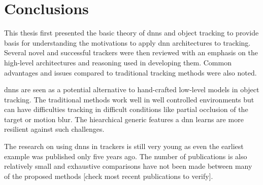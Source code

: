 \section{Conclusions}

This thesis first presented the basic theory of \ac{dnn}s and object tracking to
provide basis for understanding the motivations to apply \ac{dnn} architectures
to tracking. Several novel and successful trackers were then reviewed with an emphasis
on the high-level architectures and reasoning used in developing them. Common advantages
and issues compared to traditional tracking methods were also noted.

\ac{dnn}s are seen as a potential alternative to hand-crafted low-level models in
object tracking. The traditional methods work well in well controlled environments
but can have difficulties tracking in difficult conditions like partial occlusion
of the target or motion blur. The hiearchical generic features a \ac{dnn} learns
are more resilient against such challenges.

The research on using \ac{dnn}s in trackers is still very young as even the earliest
example was published only five years ago. The number of publications is also relatively
small and exhaustive comparisons have not been made between many of the proposed
methods [check most recent publications to verify].